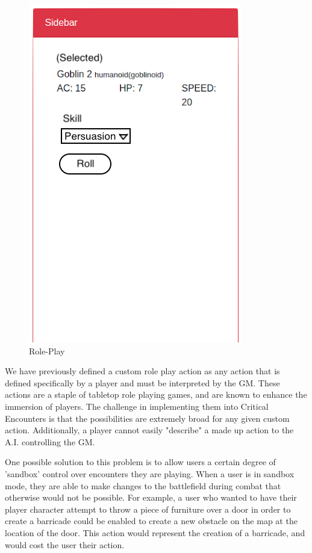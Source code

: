 \documentclass[12pt,a4paper]{report}
\begin{document}
		\begin{figure}[H]
			\centering
			\includegraphics[scale=.3]{roleplay}
			\caption{Role-Play}
			\label{fig: Role-Play}
		\end{figure}
		
		We have previously defined a custom role play action as any action that is defined specifically by a player and must be interpreted by the GM. These actions are a staple of tabletop role playing games, and are known to enhance the immersion of players. The challenge in implementing them into Critical Encounters is that the possibilities are extremely broad for any given custom action. Additionally, a player cannot easily "describe" a made up action to the A.I. controlling the GM. 
		
		One possible solution to this problem is to allow users a certain degree of 'sandbox' control over encounters they are playing. When a user is in sandbox mode, they are able to make changes to the battlefield during combat that otherwise would not be possible. For example, a user who wanted to have their player character attempt to throw a piece of furniture over a door in order to create a barricade could be enabled to create a new obstacle on the map at the location of the door. This action would represent the creation of a barricade, and would cost the user their action. 
		
\end{document}
